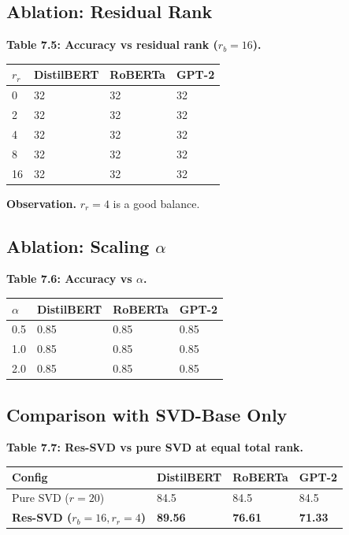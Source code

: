 \subsection{Ablation: Residual Rank}

\textbf{Table 7.5: Accuracy vs residual rank ($r_b = 16$).}

\begin{table}[H]
\centering
\small
\begin{tabular}{llll}
\toprule
\textbf{$r_r$} & \textbf{DistilBERT} & \textbf{RoBERTa} & \textbf{GPT-2} \\
\midrule
0 & 32 & 32 & 32 \\
2 & 32 & 32 & 32 \\
4 & 32 & 32 & 32 \\
8 & 32 & 32 & 32 \\
16 & 32 & 32 & 32 \\
\bottomrule
\end{tabular}
\end{table}

\textbf{Observation.} $r_r = 4$ is a good balance.

\subsection{Ablation: Scaling $\alpha$}

\textbf{Table 7.6: Accuracy vs $\alpha$.}

\begin{table}[H]
\centering
\small
\begin{tabular}{llll}
\toprule
\textbf{$\alpha$} & \textbf{DistilBERT} & \textbf{RoBERTa} & \textbf{GPT-2} \\
\midrule
0.5 & 0.85 & 0.85 & 0.85 \\
1.0 & 0.85 & 0.85 & 0.85 \\
2.0 & 0.85 & 0.85 & 0.85 \\
\bottomrule
\end{tabular}
\end{table}

\subsection{Comparison with SVD-Base Only}

\textbf{Table 7.7: Res-SVD vs pure SVD at equal total rank.}

\begin{table}[H]
\centering
\small
\begin{tabular}{llll}
\toprule
\textbf{Config} & \textbf{DistilBERT} & \textbf{RoBERTa} & \textbf{GPT-2} \\
\midrule
Pure SVD ($r=20$) & 84.5 & 84.5 & 84.5 \\
\textbf{Res-SVD ($r_b=16, r_r=4$)} & \textbf{89.56} & \textbf{76.61} & \textbf{71.33} \\
\bottomrule
\end{tabular}
\end{table}

